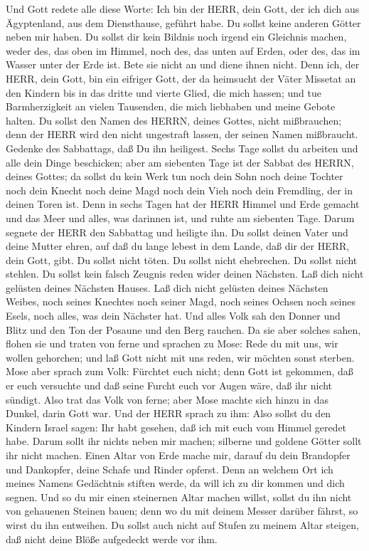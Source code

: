  Und Gott redete alle diese Worte:  Ich bin der
HERR, dein Gott, der ich dich aus Ägyptenland, aus dem Diensthause,
geführt habe.  Du sollst keine anderen Götter neben mir
haben.  Du sollst dir kein Bildnis noch irgend ein Gleichnis
machen, weder des, das oben im Himmel, noch des, das unten auf Erden,
oder des, das im Wasser unter der Erde ist.  Bete sie nicht
an und diene ihnen nicht. Denn ich, der HERR, dein Gott, bin ein
eifriger Gott, der da heimsucht der Väter Missetat an den Kindern bis in
das dritte und vierte Glied, die mich hassen;  und tue
Barmherzigkeit an vielen Tausenden, die mich liebhaben und meine Gebote
halten.  Du sollst den Namen des HERRN, deines Gottes, nicht
mißbrauchen; denn der HERR wird den nicht ungestraft lassen, der seinen
Namen mißbraucht.  Gedenke des Sabbattags, daß Du ihn
heiligest.  Sechs Tage sollst du arbeiten und alle dein
Dinge beschicken;  aber am siebenten Tage ist der Sabbat
des HERRN, deines Gottes; da sollst du kein Werk tun noch dein Sohn noch
deine Tochter noch dein Knecht noch deine Magd noch dein Vieh noch dein
Fremdling, der in deinen Toren ist.  Denn in sechs Tagen
hat der HERR Himmel und Erde gemacht und das Meer und alles, was
darinnen ist, und ruhte am siebenten Tage. Darum segnete der HERR den
Sabbattag und heiligte ihn.  Du sollst deinen Vater und
deine Mutter ehren, auf daß du lange lebest in dem Lande, daß dir der
HERR, dein Gott, gibt.  Du sollst nicht töten.
 Du sollst nicht ehebrechen.  Du sollst nicht
stehlen.  Du sollst kein falsch Zeugnis reden wider deinen
Nächsten.  Laß dich nicht gelüsten deines Nächsten Hauses.
Laß dich nicht gelüsten deines Nächsten Weibes, noch seines Knechtes
noch seiner Magd, noch seines Ochsen noch seines Esels, noch alles, was
dein Nächster hat.  Und alles Volk sah den Donner und Blitz
und den Ton der Posaune und den Berg rauchen. Da sie aber solches sahen,
flohen sie und traten von ferne  und sprachen zu Mose: Rede
du mit uns, wir wollen gehorchen; und laß Gott nicht mit uns reden, wir
möchten sonst sterben.  Mose aber sprach zum Volk: Fürchtet
euch nicht; denn Gott ist gekommen, daß er euch versuchte und daß seine
Furcht euch vor Augen wäre, daß ihr nicht sündigt.  Also
trat das Volk von ferne; aber Mose machte sich hinzu in das Dunkel,
darin Gott war.  Und der HERR sprach zu ihm: Also sollst du
den Kindern Israel sagen: Ihr habt gesehen, daß ich mit euch vom Himmel
geredet habe.  Darum sollt ihr nichts neben mir machen;
silberne und goldene Götter sollt ihr nicht machen.  Einen
Altar von Erde mache mir, darauf du dein Brandopfer und Dankopfer, deine
Schafe und Rinder opferst. Denn an welchem Ort ich meines Namens
Gedächtnis stiften werde, da will ich zu dir kommen und dich segnen.
 Und so du mir einen steinernen Altar machen willst, sollst
du ihn nicht von gehauenen Steinen bauen; denn wo du mit deinem Messer
darüber fährst, so wirst du ihn entweihen.  Du sollst auch
nicht auf Stufen zu meinem Altar steigen, daß nicht deine Blöße
aufgedeckt werde vor ihm.

